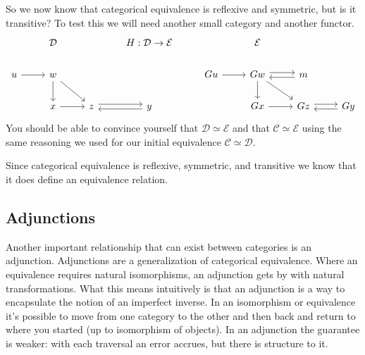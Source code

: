 \documentclass[12pt]{article}
\begin{document}
So we now know that categorical equivalence is reflexive and symmetric, but is it transitive?
To test this we will need another small category and another functor.
\[\begin{tikzcd}
        & {\mathcal{D}} && {H:\mathcal{D}\rightarrow\mathcal{E}} && {\mathcal{E}} \\
        u & w &&& Gu & Gw & m \\
        & x & z & y && Gx & Gz & Gy
        \arrow[from=2-6, to=3-6]
        \arrow[from=2-1, to=2-2]
        \arrow[from=2-2, to=3-2]
        \arrow[from=3-2, to=3-3]
        \arrow[from=2-2, to=3-3]
        \arrow[shift left, from=3-3, to=3-4]
        \arrow[shift left, from=3-4, to=3-3]
        \arrow[from=2-6, to=3-7]
        \arrow[from=3-6, to=3-7]
        \arrow[from=2-5, to=2-6]
        \arrow[shift left, from=2-6, to=2-7]
        \arrow[shift left, from=2-7, to=2-6]
        \arrow[shift left, from=3-7, to=3-8]
        \arrow[shift left, from=3-8, to=3-7]
    \end{tikzcd}\]
You should be able to convince yourself that $\mathcal{D}\simeq\mathcal{E}$ and that $\mathcal{C}\simeq\mathcal{E}$ using the same reasoning we used for our initial equivalence $\mathcal{C}\simeq\mathcal{D}$.

Since categorical equivalence is reflexive, symmetric, and transitive we know that it does define an equivalence relation.



\subsection*{Adjunctions}
Another important relationship that can exist between categories is an adjunction.
Adjunctions are a generalization of categorical equivalence.
Where an equivalence requires natural isomorphisms, an adjunction gets by with natural transformations.
What this means intuitively is that an adjunction is a way to encapsulate the notion of an imperfect inverse.
In an isomorphism or equivalence it's possible to move from one category to the other and then back and return to where you started (up to isomorphism of objects).
In an adjunction the guarantee is weaker: with each traversal an error accrues, but there is structure to it.
\end{document}
